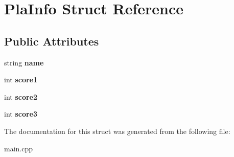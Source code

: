 \hypertarget{struct_pla_info}{}\section{Pla\+Info Struct Reference}
\label{struct_pla_info}
\subsection*{Public Attributes}
\begin{DoxyCompactItemize}
\item 
\mbox{\label{struct_pla_info_a58d626345322507ec6866afe081dc517}} 
string {\bfseries name}
\item 
\mbox{\label{struct_pla_info_a75ebc6c113b3dff8becf14108d8de172}} 
int {\bfseries score1}
\item 
\mbox{\label{struct_pla_info_a5a9ffcefce265102e7b839c47fedda02}} 
int {\bfseries score2}
\item 
\mbox{\label{struct_pla_info_a20a89e5be2752b8da344acf46875e101}} 
int {\bfseries score3}
\end{DoxyCompactItemize}


The documentation for this struct was generated from the following file\+:\begin{DoxyCompactItemize}
\item 
main.\+cpp\end{DoxyCompactItemize}
